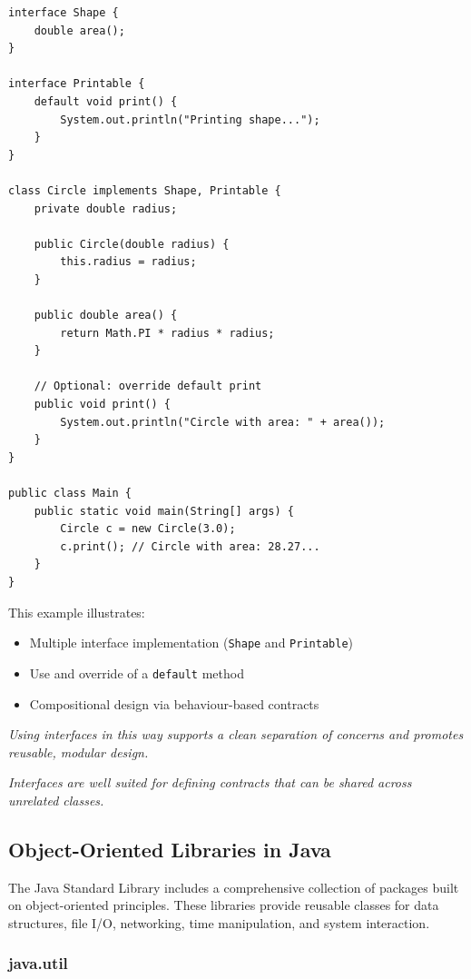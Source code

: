 \documentclass{article}
\newcommand{\codecmd}[1]{\textcolor[rgb]{0,0.5,0}{\texttt{#1}}}
\begin{document}
\begin{verbatim}
interface Shape {
    double area();
}

interface Printable {
    default void print() {
        System.out.println("Printing shape...");
    }
}

class Circle implements Shape, Printable {
    private double radius;

    public Circle(double radius) {
        this.radius = radius;
    }

    public double area() {
        return Math.PI * radius * radius;
    }

    // Optional: override default print
    public void print() {
        System.out.println("Circle with area: " + area());
    }
}

public class Main {
    public static void main(String[] args) {
        Circle c = new Circle(3.0);
        c.print(); // Circle with area: 28.27...
    }
}
\end{verbatim}

This example illustrates:
\begin{itemize}
    \item Multiple interface implementation (\codecmd{Shape} and \codecmd{Printable})
    \item Use and override of a \codecmd{default} method
    \item Compositional design via behaviour-based contracts
\end{itemize}

\medskip
\textit{Using interfaces in this way supports a clean separation of concerns and promotes reusable, modular design.}


\medskip
\textit{Interfaces are well suited for defining contracts that can be shared across unrelated classes.}

\subsection{Object-Oriented Libraries in Java}

The Java Standard Library includes a comprehensive collection of packages built on object-oriented principles. These libraries provide reusable classes for data structures, file I/O, networking, time manipulation, and system interaction.

\subsubsection*{java.util}
\end{document}
